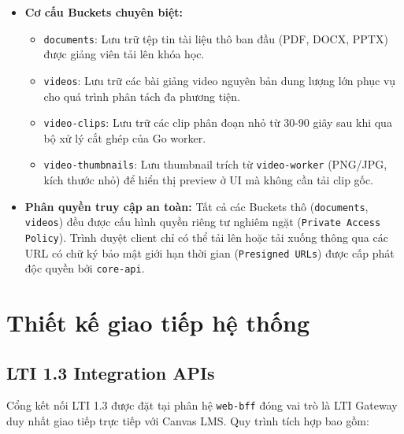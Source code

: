 \begin{itemize}
    \item \textbf{Cơ cấu Buckets chuyên biệt:}
    \begin{itemize}
        \item \texttt{documents}: Lưu trữ tệp tin tài liệu thô ban đầu
              (PDF, DOCX, PPTX) được giảng viên tải lên khóa học.
        \item \texttt{videos}: Lưu trữ các bài giảng video nguyên bản dung
              lượng lớn phục vụ cho quá trình phân tách đa phương tiện.
        \item \texttt{video-clips}: Lưu trữ các clip phân đoạn nhỏ từ
              30-90 giây sau khi qua bộ xử lý cắt ghép của Go worker.
        \item \texttt{video-thumbnails}: Lưu thumbnail trích từ
              \texttt{video-worker} (PNG/JPG, kích thước nhỏ) để hiển thị
              preview ở UI mà không cần tải clip gốc.
    \end{itemize}
    \item \textbf{Phân quyền truy cập an toàn:} Tất cả các Buckets thô
          (\texttt{documents}, \texttt{videos}) đều được cấu hình quyền
          riêng tư nghiêm ngặt (\texttt{Private Access Policy}). Trình
          duyệt client chỉ có thể tải lên hoặc tải xuống thông qua các URL
          có chữ ký bảo mật giới hạn thời gian (\texttt{Presigned URLs})
          được cấp phát độc quyền bởi \texttt{core-api}.
\end{itemize}

\section{Thiết kế giao tiếp hệ thống}

\subsection{LTI 1.3 Integration APIs}

Cổng kết nối LTI 1.3 được đặt tại phân hệ \texttt{web-bff} đóng vai trò là
LTI Gateway duy nhất giao tiếp trực tiếp với Canvas LMS. Quy trình tích
hợp bao gồm:

